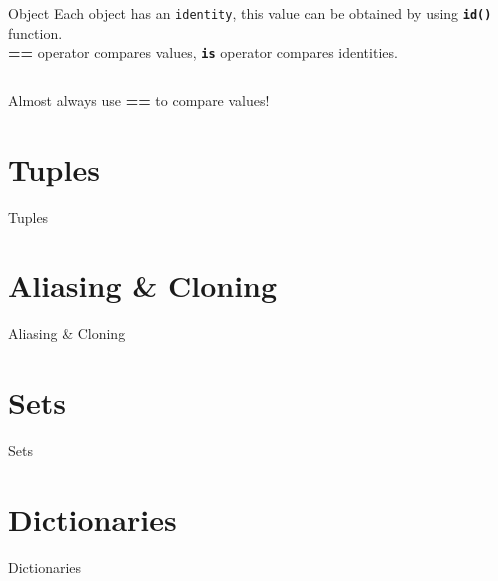     \begin{frame}{Object}
        \LARGE
        Each object has an \texttt{identity},
        \pause
         this value can be obtained by using \texttt{\textbf{id()}} function.\\
        \pause
        \textbf{==} operator compares values, \textbf{\texttt{is}} operator compares identities. 
        \pause
        \inputminted[frame=single,framesep=2pt]{python3}{code-examples/identity.py}
        \pause
        Almost always use \textbf{==} to compare values!
    \end{frame}

    \section{Tuples}
    \begin{frame}{Tuples}
            
    \end{frame}
    \section{Aliasing \& Cloning}
    \begin{frame}{Aliasing \& Cloning}
            
    \end{frame}
    \section{Sets}
    \begin{frame}{Sets}
            
    \end{frame}
    \section{Dictionaries}
    \begin{frame}{Dictionaries}
            
    \end{frame}

